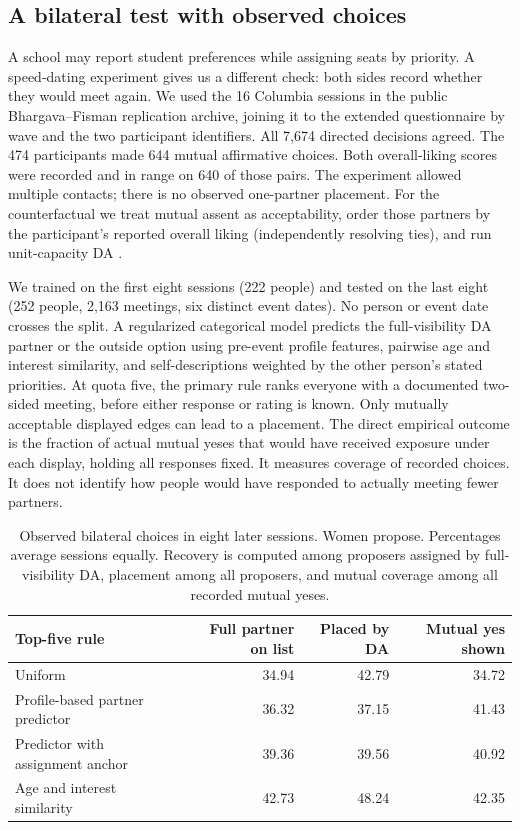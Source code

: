 \subsection{A bilateral test with observed choices}\label{app:observed-bilateral}
A school may report student preferences while assigning seats by priority. A speed-dating experiment gives us a different check: both sides record whether they would meet again. We used the 16 Columbia sessions in the public Bhargava--Fisman replication archive, joining it to the extended questionnaire by wave and the two participant identifiers. All 7,674 directed decisions agreed. The 474 participants made 644 mutual affirmative choices. Both overall-liking scores were recorded and in range on 640 of those pairs. The experiment allowed multiple contacts; there is no observed one-partner placement. For the counterfactual we treat mutual assent as acceptability, order those partners by the participant's reported overall liking (independently resolving ties), and run unit-capacity DA \citep{fisman2006dating,bhargava2014data}.

We trained on the first eight sessions (222 people) and tested on the last eight (252 people, 2,163 meetings, six distinct event dates). No person or event date crosses the split. A regularized categorical model predicts the full-visibility DA partner or the outside option using pre-event profile features, pairwise age and interest similarity, and self-descriptions weighted by the other person's stated priorities. At quota five, the primary rule ranks everyone with a documented two-sided meeting, before either response or rating is known. Only mutually acceptable displayed edges can lead to a placement. The direct empirical outcome is the fraction of actual mutual yeses that would have received exposure under each display, holding all responses fixed. It measures coverage of recorded choices. It does not identify how people would have responded to actually meeting fewer partners.

\begin{table}[ht]\centering\small
\caption{Observed bilateral choices in eight later sessions. Women propose. Percentages average sessions equally. Recovery is computed among proposers assigned by full-visibility DA, placement among all proposers, and mutual coverage among all recorded mutual yeses.}
\begin{tabular}{@{}lrrr@{}}\toprule
Top-five rule & Full partner on list & Placed by DA & Mutual yes shown\\\midrule
Uniform & 34.94 & 42.79 & 34.72\\
Profile-based partner predictor & 36.32 & 37.15 & 41.43\\
Predictor with assignment anchor & 39.36 & 39.56 & 40.92\\
Age and interest similarity & 42.73 & 48.24 & 42.35\\\bottomrule
\end{tabular}\label{tab:bilateral-real}\end{table}

